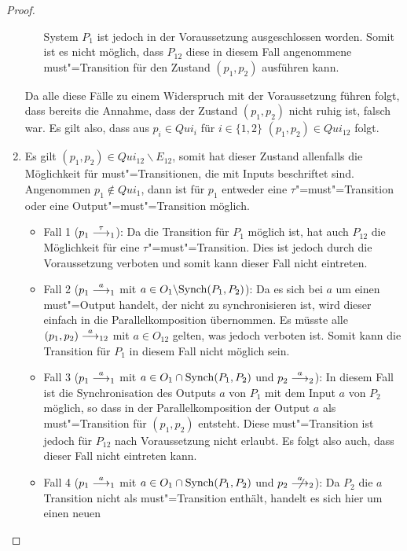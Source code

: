 \begin{proof}
\begin{enumerate}
\begin{itemize}
          System $P_1$ ist jedoch in der Voraussetzung ausgeschlossen worden.
          Somit ist es nicht möglich, dass $P_{12}$ diese in diesem Fall
          angenommene must"=Transition für den Zustand $(p_1,p_2)$ ausführen
          kann.
      \end{itemize}
      Da alle diese Fälle zu einem Widerspruch mit der Voraussetzung führen
      folgt, dass bereits die Annahme, dass der Zustand $(p_1,p_2)$ nicht ruhig
      ist, falsch war. Es gilt also, dass aus $p_i\in Qui_i$ für $i\in\{1,2\}$
      $(p_1,p_2)\in Qui_{12}$ folgt.
    \item Es gilt $(p_1,p_2)\in Qui_{12}\backslash E_{12}$, somit hat dieser
      Zustand allenfalls die Möglichkeit für must"=Transitionen, die mit Inputs
      beschriftet sind.\\
      Angenommen $p_1\notin Qui _1$, dann ist für $p_1$ entweder eine
      $\tau$"=must"=Transition oder eine Output"=must"=Transition möglich.
      \begin{itemize}
        \item Fall 1 \big($p_1\must[\tau]_1$\big): Da die Transition für $P_1$
          möglich ist, hat auch $P_{12}$ die Möglichkeit für eine
          $\tau$"=must"=Transition. Dies ist jedoch durch die Voraussetzung
          verboten und somit kann dieser Fall nicht eintreten.
        \item Fall 2 \big($p_1\must[a]_1$ mit $a\in O_1\backslash
          \mathrm{Synch}(P_1,P_2)$\big): Da es sich bei $a$ um einen must"=Output
          handelt, der nicht zu synchronisieren ist, wird dieser einfach in die
          Parallelkomposition übernommen. Es müsste alle $(p_1,p_2)
          \must[a]_{12}$ mit $a\in O_{12}$ gelten, was jedoch verboten ist.
          Somit kann die Transition für $P_1$ in diesem Fall nicht möglich
          sein.
        \item Fall 3 \big($p_1\must[a]_1$ mit $a\in O_1\cap\mathrm{Synch}(P_1,P_2)$ und
          $p_2\must[a]_2$\big): In diesem Fall ist die Synchronisation des
          Outputs $a$ von $P_1$ mit dem Input $a$ von $P_2$ möglich, so dass in
          der Parallelkomposition der Output $a$ als must"=Transition für
          $(p_1,p_2)$ entsteht. Diese must"=Transition ist jedoch für $P_{12}$
          nach Voraussetzung nicht erlaubt. Es folgt also auch, dass dieser
          Fall nicht eintreten kann.
        \item Fall 4 \big($p_1\must[a]_1$ mit $a\in O_1\cap\mathrm{Synch}(P_1,P_2)$ und
          $p_2\nmust[a]_2$\big): Da $P_2$ die $a$ Transition nicht als
          must"=Transition enthält, handelt es sich hier um einen neuen

\end{itemize}
\end{enumerate}
\end{proof}
